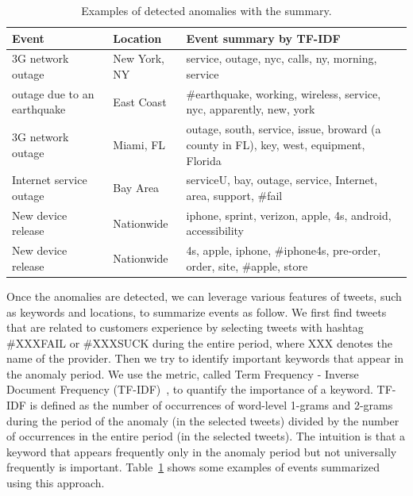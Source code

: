 \begin{table}
  {\small
\begin{center}
  \begin{tabular}{ | p{5cm} || l | p{7cm} |  }
    \hline
        Event & Location & Event summary by TF-IDF\\ \hline
    \hline
        3G network outage & New York, NY & service, outage, nyc, calls, ny, morning, service \\ \hline
        outage due to an earthquake & East Coast & \#earthquake, working, wireless, service, nyc, apparently, new, york \\ \hline
        3G network outage & Miami, FL & outage, south, service, issue, broward (a county in FL), key, west, equipment, Florida \\ \hline
        Internet service outage & Bay Area & serviceU, bay, outage, service, Internet, area, support, \#fail \\ \hline
        New device release & Nationwide & iphone, sprint, verizon, apple, 4s, android, accessibility \\ \hline
        New device release & Nationwide & 4s, apple, iphone, \#iphone4s, pre-order, order, site, \#apple, store \\ \hline
  \end{tabular}
\end{center}
\caption{
Examples of detected anomalies with the summary. 
}
\label{table:att-events}
}
\end{table}

 Once the anomalies are detected,
we can leverage various features of tweets, such as keywords and locations, to summarize events as follow. We first find tweets that are related to customers experience
by selecting tweets with hashtag \#XXXFAIL or \#XXXSUCK during the
entire period, where XXX denotes the name of the provider. Then we try to identify important keywords that appear in the anomaly period. We use the metric, called Term Frequency - Inverse Document Frequency (TF-IDF)~\cite{TFIDF}, to quantify the importance of a keyword. TF-IDF is defined as the number of occurrences of word-level 1-grams and 2-grams during the period of the anomaly (in the selected tweets) divided by the number of occurrences in the entire period (in the selected tweets). The intuition is that a keyword that appears frequently only in the anomaly period but not universally frequently is important. Table~\ref{table:att-events} shows some examples of events summarized using this approach. 

